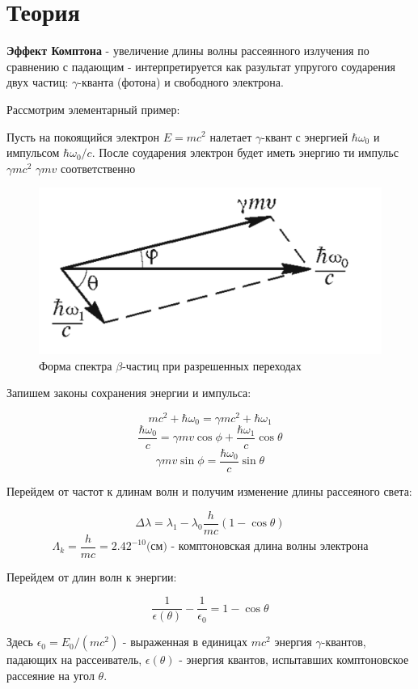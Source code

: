\documentclass[a4paper]{article}
\begin{document}
\section{Теория}

\textbf{Эффект Комптона} - увеличение длины волны рассеянного излучения по сравнению с падающим - 
интерпретируется как разультат упругого соударения двух частиц: $\gamma$-кванта (фотона) и свободного 
электрона.

Рассмотрим элементарный пример:

Пусть на покоящийся электрон $E = mc^2$ налетает $\gamma$-квант с энергией $\hbar \omega_0$ и импульсом
$\hbar \omega_0/c$. После соударения электрон будет иметь энергию ти импульс $\gamma mc^2$   $\gamma m v$ 
соответственно

\begin{figure}
    \includegraphics[scale = 0.2]{p1.png}
    \caption{Форма спектра $\beta$-частиц при разрешенных переходах}
    \label{p1}
\end{figure}

Запишем законы сохранения энергии и импульса:

$$mc^2 + \hbar\omega_0 = \gamma mc^2 + \hbar \omega_1$$
$$\frac{\hbar \omega_0}{c} = \gamma mv\cos{\phi} + \frac{\hbar \omega_1}{c}\cos{\theta}$$
$$\gamma mv\sin{\phi} = \frac{\hbar \omega_0}{c}\sin{\theta}$$

Перейдем от частот к длинам волн и получим изменение длины рассеяного света:

$$\Delta \lambda = \lambda_1 - \lambda_0 \frac{h}{mc} (1 - \cos{\theta})$$
$$\Lambda_k = \frac{h}{mc} = 2.42^{-10} \text{(см) - комптоновская длина волны электрона}$$

Перейдем от длин волн к энергии:

$$\frac{1}{\epsilon(\theta)} - \frac{1}{\epsilon_0} = 1 - \cos{\theta}$$

Здесь $\epsilon_0 = E_0 / (mc^2)$ - выраженная в единицах $mc^2$ энергия $\gamma$-квантов, 
падающих на рассеиватель, $\epsilon(\theta)$ - энергия квантов, испытавших комптоновское рассеяние на угол $\theta$.
\end{document}
